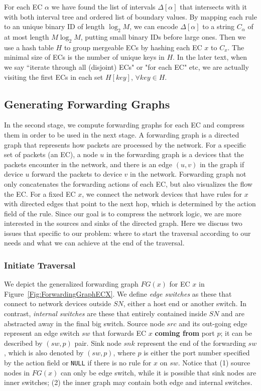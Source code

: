 For each EC $\alpha$ we have found the list of intervals $\Delta[\alpha]$
that intersects with it with both interval tree and ordered list of boundary values.
By mapping each rule to an unique binary ID of length $\log_2 M$,
we can encode $\Delta[\alpha]$ to a string $C_\alpha$ of at most length $M\log_2 M$, putting
small binary IDs before large ones.
Then we use a hash table $H$ to group mergeable ECs by hashing each EC $x$ to $C_x$.
The minimal size of ECs is the number of unique keys in $H$.
In the later text, when we say ``iterate through all (disjoint) ECs" or "for each EC" etc,
we are actually visiting the first ECs in each set $H[key]$, $\forall key \in H$.


\subsection{Generating Forwarding Graphs}
\label{Sec:Generating Forwarding Graphs}

In the second stage, we compute forwarding graphs for each EC and
compress them in order to be used in the next stage. A forwarding graph is a directed graph that represents how packets are processed by the network. For a specific set of packets (an EC), a node $u$ in the forwarding graph is a devices that the packets encounter in the network, and there is an edge $(u, v)$ in the graph if device $u$ forward the packets to device $v$ in the network. 
Forwarding graph not only concatenates the forwarding actions of each EC,
but also visualizes the flow the EC.
For a fixed EC $x$, we connect the network devices that have rules for $x$
with directed edges that point to the next hop,
which is determined by the action field of the rule.
Since our goal is to compress the network logic, we are more interested in the sources
and sinks of the directed graph.
Here we discuss two issues that specific to our problem: where to start the
traversal according to our needs and what we can achieve at the end of the traversal.

\subsubsection{Initiate Traversal}
We depict the generalized forwarding graph $FG(x)$ for EC $x$
in Figure~\ref{Fig:ForwardingGraphECX}.
We define \textit{edge switches} as these that connect to network devices
outside $SN$, either a host end or another switch.
In contrast, \textit{internal switches} are these that entirely contained inside
$SN$ and are abstracted away in the final big switch.
Source node $src$ and its out-going edge represent an edge switch $sw$ that
forwards EC $x$ \textbf{coming from} port $p$; it can be described by $(sw, p)$ pair.
Sink node $snk$ represent the end of the forwarding $sw$,
which is also denoted by $(sw, p)$, where $p$ is either the port number
specified by the action field or \texttt{NULL} if there is no rule for $x$ on $sw$.
Notice that (1) source nodes in $FG(x)$ can only be edge switch,
while it is possible that sink nodes are inner switches;
(2) the inner graph may contain both edge and internal switches.

